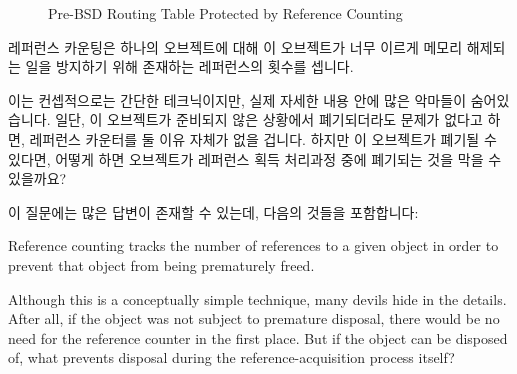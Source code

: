 \begin{figure}[tb]
\centering
{}
\caption{Pre-BSD Routing Table Protected by Reference Counting}
\label{fig:defer:Pre-BSD Routing Table Protected by Reference Counting}
\end{figure}

레퍼런스 카운팅은 하나의 오브젝트에 대해 이 오브젝트가 너무 이르게 메모리
해제되는 일을 방지하기 위해 존재하는 레퍼런스의 횟수를 셉니다.


이는 컨셉적으로는 간단한 테크닉이지만, 실제 자세한 내용 안에 많은 악마들이
숨어있습니다.
일단, 이 오브젝트가 준비되지 않은 상황에서 폐기되더라도 문제가 없다고 하면,
레퍼런스 카운터를 둘 이유 자체가 없을 겁니다.
하지만 이 오브젝트가 폐기될 수 있다면, 어떻게 하면 오브젝트가 레퍼런스 획득
처리과정 중에 폐기되는 것을 막을 수 있을까요?

이 질문에는 많은 답변이 존재할 수 있는데, 다음의 것들을 포함합니다:
\iffalse

Reference counting tracks the number of references
to a given object in order to prevent that object from being prematurely
freed.


Although this is a conceptually simple technique, many devils hide in
the details.
After all, if the object was not subject to premature disposal,
there would be no need for the reference counter in the first place.
But if the object can be disposed of, what prevents disposal during
the reference-acquisition process itself?

